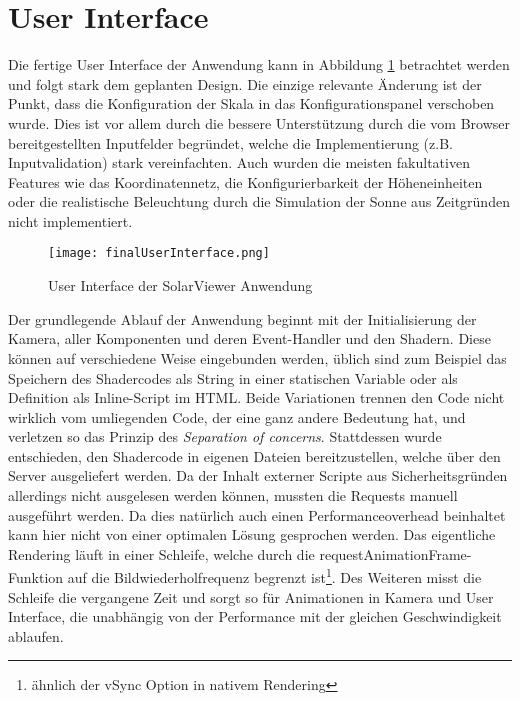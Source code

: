 \section{User Interface}
Die fertige User Interface der Anwendung kann in Abbildung \ref{finalUserInterface} betrachtet werden und folgt stark dem geplanten Design. Die einzige relevante Änderung ist der Punkt, dass die Konfiguration der Skala in das Konfigurationspanel verschoben wurde. Dies ist vor allem durch die bessere Unterstützung durch die vom Browser bereitgestellten Inputfelder begründet, welche die Implementierung (z.B. Inputvalidation) stark vereinfachten. Auch wurden die meisten fakultativen Features wie das Koordinatennetz, die Konfigurierbarkeit der Höheneinheiten oder die realistische Beleuchtung durch die Simulation der Sonne aus Zeitgründen nicht implementiert.

\begin{figure}[H]
  \texttt{[image: finalUserInterface.png]}
  \caption{User Interface der SolarViewer Anwendung}
  \label{finalUserInterface}
\end{figure}

Der grundlegende Ablauf der Anwendung beginnt mit der Initialisierung der Kamera, aller Komponenten und deren Event-Handler und den Shadern. Diese können auf verschiedene Weise eingebunden werden, üblich sind zum Beispiel das Speichern des Shadercodes als String in einer statischen Variable oder als Definition als Inline-Script im HTML. Beide Variationen trennen den Code nicht wirklich vom umliegenden Code, der eine ganz andere Bedeutung hat, und verletzen so das Prinzip des \textit{Separation of concerns}. Stattdessen wurde entschieden, den Shadercode in eigenen Dateien bereitzustellen, welche über den Server ausgeliefert werden. Da der Inhalt externer Scripte aus Sicherheitsgründen allerdings nicht ausgelesen werden können, mussten die Requests manuell ausgeführt werden. Da dies natürlich auch einen Performanceoverhead beinhaltet kann hier nicht von einer optimalen Lösung gesprochen werden. Das eigentliche Rendering läuft in einer Schleife, welche durch die requestAnimationFrame-Funktion auf die Bildwiederholfrequenz begrenzt ist\footnote{ähnlich der vSync Option in nativem Rendering}. Des Weiteren misst die Schleife die vergangene Zeit und sorgt so für Animationen in Kamera und User Interface, die unabhängig von der Performance mit der gleichen Geschwindigkeit ablaufen. 

